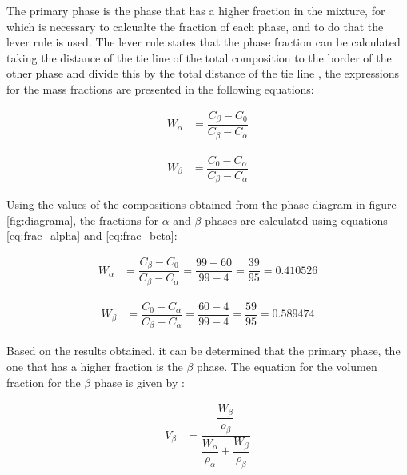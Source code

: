 
The primary phase is the phase that has a higher fraction in the mixture, for which is necessary to calcualte the fraction of each phase, and to do that the lever rule is used. The lever rule states that the phase fraction can be calculated taking the distance of the tie line of the total composition to the border of the other phase and divide this by the total distance of the tie line \citet{callister2010materials}, the expressions for the mass fractions are presented in the following equations:

\begin{align}
    \label{eq:frac_alpha}
    W_{\alpha}&=\dfrac{C_{\beta}-C_0}{C_{\beta}-C_{\alpha}}
\end{align}

\begin{align}
    \label{eq:frac_beta}
    W_{\beta}&=\dfrac{C_0-C_{\alpha}}{C_{\beta}-C_{\alpha}}
\end{align}

Using the values of the compositions obtained from the phase diagram in figure \ref{fig:diagrama}, the fractions for $\alpha$ and $\beta$ phases are calculated using equations \eqref{eq:frac_alpha} and \eqref{eq:frac_beta}:

\begin{align}
    \label{eq:w_alpha}
    W_{\alpha}&=\dfrac{C_{\beta}-C_0}{C_{\beta}-C_{\alpha}} =\dfrac{99-60}{99-4} = \dfrac{39}{95} = 0.410526
\end{align}

\begin{align}
    \label{eq:w_beta}
    W_{\beta}&=\dfrac{C_0-C_{\alpha}}{C_{\beta}-C_{\alpha}} =\dfrac{60-4}{99-4} =\dfrac{59}{95} =0.589474
\end{align}

Based on the results obtained, it can be determined that the primary phase, the one that has a higher fraction is the $\beta$ phase. The equation for the volumen fraction for the $\beta$ phase is given by \citet{callister2010materials}:

\begin{align}
    \label{eq:vol_beta}
    V_{\beta}&=\dfrac{\dfrac{W_{\beta}}{\rho_{\beta}}}{\dfrac{W_{\alpha}}{\rho_{\alpha}}+\dfrac{W_{\beta}}{\rho_{\beta}}}
\end{align}

